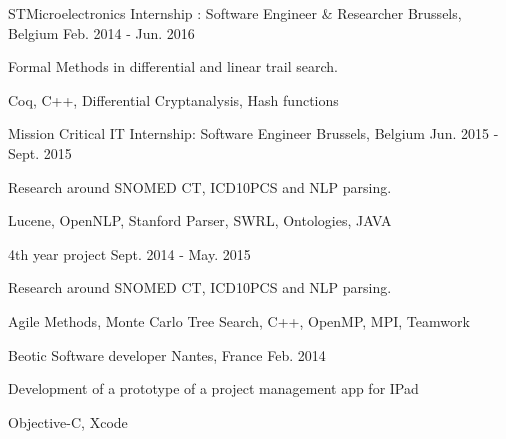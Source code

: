 

\begin{cventries}

  \cventrysix%
    {STMicroelectronics} %
    {Internship : Software Engineer \& Researcher} %
    {Brussels, Belgium} %
    {Feb. 2014 - Jun. 2016} %
    {
      \begin{cvitems} %
        \item {Formal Methods in differential and linear trail search.} %
      \end{cvitems}
    }%
    {Coq, C++, Differential Cryptanalysis, Hash functions}%

  \cventrysix%
    {Mission Critical IT} %
    {Internship: Software Engineer} %
    {Brussels, Belgium} %
    {Jun. 2015 - Sept. 2015} %
    {
      \begin{cvitems} %
        \item {Research around SNOMED CT, ICD10PCS and NLP parsing.}
      \end{cvitems}
    }%
    {Lucene, OpenNLP, Stanford Parser, SWRL, Ontologies, JAVA}%

  \cventrysix
    {} %
    {4th year project} %
    {} %
    {Sept. 2014 - May. 2015} %
    {
      \begin{cvitems} %
        \item {Research around SNOMED CT, ICD10PCS and NLP parsing.}
      \end{cvitems}
    }%
    {Agile Methods, Monte Carlo Tree Search, C++, OpenMP, MPI, Teamwork}

  \cventrysix
    {Beotic} %
    {Software developer} %
    {Nantes, France} %
    {Feb. 2014} %
    {
      \begin{cvitems} %
        \item {Development of a prototype of a project management app for IPad}
      \end{cvitems}
    }%
    {Objective-C, Xcode}



\end{cventries}

